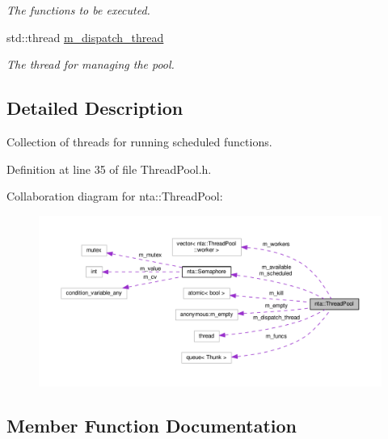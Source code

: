 \begin{DoxyCompactItemize}
\begin{DoxyCompactList}\small\item\em The functions to be executed. \end{DoxyCompactList}\item 
\mbox{\label{classnta_1_1ThreadPool_ab8770d73ed374fe340e418bce832cbca}} 
std\+::thread \hyperlink{classnta_1_1ThreadPool_ab8770d73ed374fe340e418bce832cbca}{m\+\_\+dispatch\+\_\+thread}
\begin{DoxyCompactList}\small\item\em The thread for managing the pool. \end{DoxyCompactList}\end{DoxyCompactItemize}


\subsection{Detailed Description}
Collection of threads for running scheduled functions. 

Definition at line 35 of file Thread\+Pool.\+h.



Collaboration diagram for nta\+:\+:Thread\+Pool\+:
\nopagebreak
\begin{figure}[H]
\begin{center}
\leavevmode
\includegraphics[width=350pt]{d1/dfd/classnta_1_1ThreadPool__coll__graph}
\end{center}
\end{figure}


\subsection{Member Function Documentation}
\mbox{\label{classnta_1_1ThreadPool_ad439d625834a107a84c62c1ddcf2e936}} 
